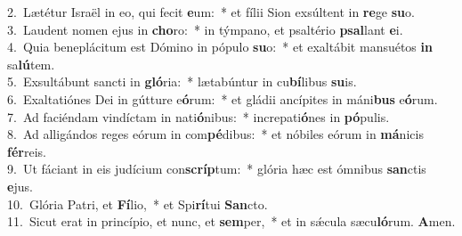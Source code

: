 {2.~}Lætétur Israël in eo, qui fecit \textbf{e}um:~* et fílii Sion exsúltent in \textbf{re}ge \textbf{su}o.\\
{3.~}Laudent nomen ejus in \textbf{cho}ro:~* in týmpano, et psaltério \textbf{psal}lant \textbf{e}i.\\
{4.~}Quia beneplácitum est Dómino in pópulo \textbf{su}o:~* et exaltábit mansuétos \textbf{in} sa\textbf{lú}tem.\\
{5.~}Exsultábunt sancti in \textbf{gló}ria:~* lætabúntur in cu\textbf{bí}libus \textbf{su}is.\\
{6.~}Exaltatiónes Dei in gútture e\textbf{ó}rum:~* et gládii ancípites in máni\textbf{bus} e\textbf{ó}rum.\\
{7.~}Ad faciéndam vindíctam in nati\textbf{ó}nibus:~* increpati\textbf{ó}nes in \textbf{pó}pulis.\\
{8.~}Ad alligándos reges eórum in com\textbf{pé}dibus:~* et nóbiles eórum in \textbf{má}nicis \textbf{fér}reis.\\
{9.~}Ut fáciant in eis judícium con\textbf{scríp}tum:~* glória hæc est ómnibus \textbf{san}ctis \textbf{e}jus.\\
{10.~}Glória Patri, et \textbf{Fí}lio,~* et Spi\textbf{rí}tui \textbf{San}cto.\\
{11.~}Sicut erat in princípio, et nunc, et \textbf{sem}per,~* et in sǽcula sæcu\textbf{ló}rum. \textbf{A}men.\\
